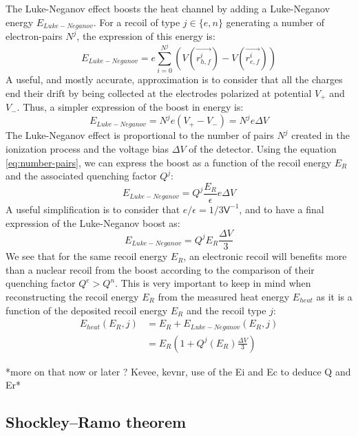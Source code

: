 The Luke-Neganov effect boosts the heat channel by adding a Luke-Neganov energy $E_{Luke-Neganov}$. For a recoil of type $j \in \{ e, n\}$ generating a number of electron-pairs $N^j$, the expression of this energy is:
\begin{equation}
E_{Luke-Neganov} = e \sum_{i=0}^{N^j} \left( V(\vec{r_{h,f}^i}) - V(\vec{r_{e,f}^i}) \right)
\end{equation}
A useful, and mostly accurate, approximation is to consider that all the charges end their drift by being collected at the electrodes polarized at potential $V_+$ and $V_-$. Thus, a simpler expression of the boost in energy is:
\begin{equation}
E_{Luke-Neganov} = N^j e (V_+ - V_-) = N^j e \Delta V
\end{equation}
The Luke-Neganov effect is proportional to the number of pairs $N^j$ created in the ionization process and the voltage bias $\Delta V$ of the detector. Using the equation \ref{eq:number-pairs}, we can express the boost as a function of the recoil energy $E_R$ and the associated quenching factor $Q^j$:
\begin{equation}
E_{Luke-Neganov} = Q^j \frac{E_R}{\epsilon} e \Delta V
\end{equation}
A useful simplification is to consider that $e / {\epsilon} = 1/3 \textsf{V}^{-1}$,  and to have a final expression of the Luke-Neganov boost as:
\begin{equation}
\label{eq:nl-boost}
E_{Luke-Neganov} = Q^j E_R \frac{\Delta V}{3}
\end{equation}
We see that for the same recoil energy $E_R$, an electronic recoil will benefits more than a nuclear recoil from the boost according to the comparison of  their quenching factor $Q^e > Q^n$. This is very important to keep in mind when reconstructing the recoil energy $E_R$ from the measured heat energy $E_{heat}$ as it is a function of the deposited recoil energy $E_R$ and the recoil type $j$:
\begin{align}
E_{heat} (E_R, j ) &= E_{R} + E_{Luke-Neganov} ( E_R, j) \\
&= E_R \left( 1 + Q^j(E_R) \frac{\Delta V}{3} \right)
\end{align}

*more on that now or later ? Kevee, kevnr, use of the Ei and Ec to deduce Q and Er*


\subsection{Shockley–Ramo theorem}
\label{par:shockley-ramo}

